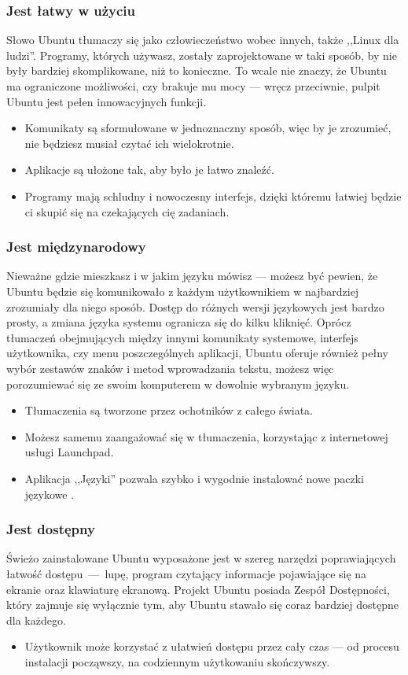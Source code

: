 \subsubsection{Jest łatwy w użyciu}
Słowo Ubuntu tłumaczy się jako \textcolor{ubuntu_orange}{człowieczeństwo wobec innych},  także ,,Linux dla ludzi''. Programy, których używasz, zostały zaprojektowane w taki sposób, by nie były bardziej skomplikowane, niż to konieczne. To wcale nie znaczy, że Ubuntu ma ograniczone możliwości, czy brakuje mu mocy --- wręcz przeciwnie, pulpit Ubuntu jest pełen innowacyjnych funkcji.
\begin{itemize}
\item Komunikaty są sformułowane w jednoznaczny sposób, więc by je zrozumieć, nie będziesz musiał czytać ich wielokrotnie.
\item Aplikacje są ułożone tak, aby było je łatwo znaleźć.
\item Programy mają schludny i nowoczesny interfejs, dzięki któremu łatwiej będzie ci skupić się na czekających cię zadaniach.
\end{itemize}
\subsubsection{Jest międzynarodowy}
Nieważne gdzie mieszkasz i w jakim języku mówisz --- możesz być pewien, że Ubuntu będzie się komunikowało z każdym użytkownikiem w najbardziej zrozumiały dla niego sposób. Dostęp do różnych wersji językowych jest bardzo prosty, a zmiana języka systemu ogranicza się do kilku kliknięć.
Oprócz tłumaczeń obejmujących między innymi komunikaty systemowe, interfejs użytkownika, czy menu poszczególnych aplikacji, Ubuntu oferuje również pełny wybór zestawów znaków i metod wprowadzania tekstu, możesz więc porozumiewać się ze swoim komputerem w dowolnie wybranym języku.
\begin{itemize}
\item Tłumaczenia są tworzone przez ochotników z całego świata.
\item Możesz samemu zaangażować się w tłumaczenia, korzystając z internetowej usługi Launchpad.
\item Aplikacja ,,Języki'' pozwala szybko i wygodnie instalować nowe paczki językowe .
\end{itemize}
\subsubsection{Jest dostępny}
Świeżo zainstalowane Ubuntu wyposażone jest w szereg narzędzi poprawiających łatwość dostępu~---~lupę, program czytający informacje pojawiające się na ekranie oraz klawiaturę ekranową. Projekt Ubuntu posiada Zespół Dostępności, który zajmuje się wyłącznie tym, aby Ubuntu stawało się coraz bardziej dostępne dla każdego.
\begin{itemize}
\item Użytkownik może korzystać z ułatwień dostępu przez cały czas --- od procesu instalacji począwszy, na codziennym użytkowaniu skończywszy.
\end{itemize}
